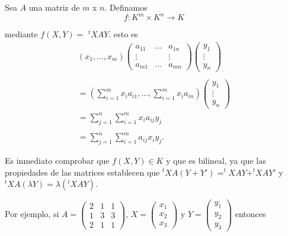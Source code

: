 		\begin{ejem}
			\normalfont
			Sea $ A $ una matriz de $ m $ x $ n $. Definamos
			\[ f:K^{m} \times K^{n} \rightarrow K \]
			
			mediante $ f(X,Y) =$ $^{t}XAY$. esto es
			\[ \begin{matrix}
				\left(x_{1}, \ldots, x_{m}\right)\left(\begin{matrix}
				a_{11} &\ldots& a_{1n} \\ \vdots & &  \vdots \\ a_{m1} & \ldots & a_{mn}
				\end{matrix}\right)\left(\begin{array}{c}
					y_{1}\\ \vdots \\ y_{n}
				\end{array}\right)
				\\ \\
				= \left(\sum_{i=1}^{m}x_{i}a_{i1},\ldots,\sum_{i=1}^{m}x_{i}a_{in}\right) \left(\begin{array}{c}
				y_{1}\\ \vdots \\ y_{n}
				\end{array}\right)
				\\
				 = \sum_{j=1}^{n} \sum_{i=1}^{m}x_{i}a_{ij}y_{j} 
				 \\ \\
				 = \sum_{j=1}^{n} \sum_{i=1}^{m}a_{ij}x_{i}y_{j}. 
			\end{matrix} 
			 \]
		\end{ejem}
			Es inmediato comprobar que $ f(X,Y) \in K $ y que es bilineal, ya que las propiedades de las matrices establecen que $ ^{t}XA(Y+Y') = ^{t}XAY+^{t}XAY'$ y $ ^{t}XA(\lambda Y) = \lambda(^{t}XAY) $.
			
			Por ejemplo, si $ A = \left(\begin{matrix}
			2 & 1 & 1 \\ 1 & 3 & 3 \\ 2 & 1 & 1 
			\end{matrix}\right)$, $ X = \left(\begin{matrix}
			x_{1} \\ x_{2} \\ x_{3}
			\end{matrix}\right) $ y $ Y = \left(\begin{matrix}
			y_{1} \\ y_{2} \\ y_{3}
			\end{matrix}\right) $ entonces 
		
